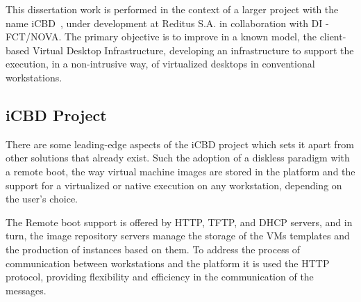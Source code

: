 This dissertation work is performed in the context of a larger project with the name \gls{iCBD}~\cite{Lopes2017}, under development at Reditus S.A. in collaboration with DI - FCT/NOVA.
The primary objective is to improve in a known model, the client-based Virtual Desktop Infrastructure, developing an infrastructure to support the execution, in a non-intrusive way, of virtualized desktops in conventional workstations.





\subsection{iCBD Project} %
\label{sub:icbd_project}


There are some leading-edge aspects of the \acrfull{iCBD} project which sets it apart from other solutions that already exist. Such the adoption of a diskless paradigm with a remote boot, the way virtual machine images are stored in the platform and the support for a virtualized or native execution on any workstation, depending on the user's choice.~\cite{P2020}

The Remote boot support is offered by \acrshort{HTTP}, \acrshort{TFTP}, and \acrshort{DHCP} servers, and in turn, the image repository servers manage the storage of the VMs templates and the production of instances based on them.
To address the process of communication between workstations and the platform it is used the HTTP protocol, providing flexibility and efficiency in the communication of the messages.~\cite{P2020,Nuno2016,Eduardo2016}


